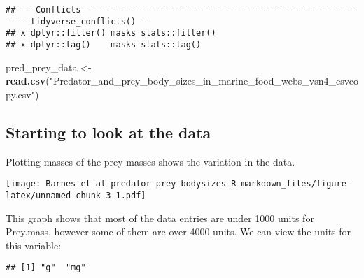 \documentclass[
]{article}
\newenvironment{Shaded}{\begin{snugshade}}{\end{snugshade}}
\newcommand{\KeywordTok}[1]{\textcolor[rgb]{0.13,0.29,0.53}{\textbf{#1}}}
\newcommand{\NormalTok}[1]{#1}
\newcommand{\OperatorTok}[1]{\textcolor[rgb]{0.81,0.36,0.00}{\textbf{#1}}}
\newcommand{\StringTok}[1]{\textcolor[rgb]{0.31,0.60,0.02}{#1}}
\begin{document}
\begin{verbatim}
## -- Conflicts ---------------------------------------------------------- tidyverse_conflicts() --
## x dplyr::filter() masks stats::filter()
## x dplyr::lag()    masks stats::lag()
\end{verbatim}

\begin{Shaded}
\begin{Highlighting}[]
\NormalTok{pred_prey_data <-}\StringTok{ }\KeywordTok{read.csv}\NormalTok{(}\StringTok{"Predator_and_prey_body_sizes_in_marine_food_webs_vsn4_csvcopy.csv"}\NormalTok{)}
\end{Highlighting}
\end{Shaded}

\hypertarget{starting-to-look-at-the-data}{%
\subsection{Starting to look at the
data}\label{starting-to-look-at-the-data}}

Plotting masses of the prey masses shows the variation in the data.

\begin{Shaded}
\end{Shaded}

\texttt{[image: Barnes-et-al-predator-prey-bodysizes-R-markdown\_files/figure-latex/unnamed-chunk-3-1.pdf]}

This graph shows that most of the data entries are under 1000 units for
Prey.mass, however some of them are over 4000 units. We can view the
units for this variable:

\begin{Shaded}
\end{Shaded}

\begin{verbatim}
## [1] "g"  "mg"
\end{verbatim}

\begin{Shaded}
\end{Shaded}
\end{document}
